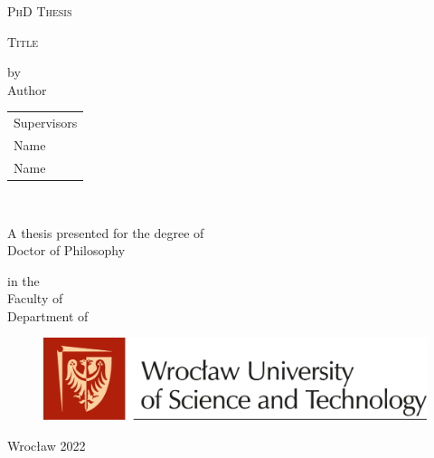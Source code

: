 \begin{titlingpage}

\vspace*{2cm}


\begin{center}
    \Large
    \myleftornc\quad\textsc{PhD Thesis}\quad\myrightornc
\end{center}

\vspace*{-0.1cm}

\begin{center}
    \printchapternonum
    \Huge\scshape{Title}
    \afterchapternum
\end{center}

\begin{center}
    \Large
    by\\[1ex]
    Author
\end{center}

\vfill

\begin{flushright}
    \begin{tabular}{l}
	Supervisors\\
    Name\\
    Name
    \end{tabular}
    \\[3\baselineskip]
\end{flushright}


\vfill

\begin{center}
    A thesis presented for the degree of\\ Doctor of Philosophy\\
\end{center}

\begin{center}
    in the \\ Faculty of  \\
    Department of 
\end{center}

\begin{figure}[h]
    \centering
    \includegraphics[scale=0.4]{figs/uni_banner_color.png}
\end{figure}


\afterchapternum


\begin{center}
    Wrocław 2022
\end{center}

\end{titlingpage}